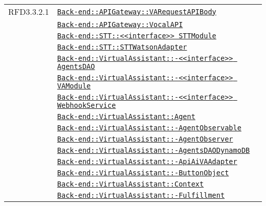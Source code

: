 \begin{longtable}{|>{\centering}m{3cm}|m{10cm}<{\centering}|}
RFD3.3.2.1 & \hyperref[Back-end::APIGateway::VARequestAPIBody]{\texttt{Back-end::APIGateway::VARequestAPIBody}}\\
& \hyperref[Back-end::APIGateway::VocalAPI]{\texttt{Back-end::APIGateway::VocalAPI}}\\
& \hyperref[Back-end::STT::<<interface>> STTModule]{\texttt{Back-end::STT::<<interface>> STTModule}}\\
& \hyperref[Back-end::STT::STTWatsonAdapter]{\texttt{Back-end::STT::STTWatsonAdapter}}\\
& \hyperref[Back-end::VirtualAssistant::<<interface>> AgentsDAO]{\texttt{Back-end::VirtualAssistant::-\linebreak <<interface>> AgentsDAO}}\\
& \hyperref[Back-end::VirtualAssistant::<<interface>> VAModule]{\texttt{Back-end::VirtualAssistant::-\linebreak <<interface>> VAModule}}\\
& \hyperref[Back-end::VirtualAssistant::<<interface>> WebhookService]{\texttt{Back-end::VirtualAssistant::-\linebreak <<interface>> WebhookService}}\\
& \hyperref[Back-end::VirtualAssistant::Agent]{\texttt{Back-end::VirtualAssistant::Agent}}\\
& \hyperref[Back-end::VirtualAssistant::AgentObservable]{\texttt{Back-end::VirtualAssistant::-\linebreak AgentObservable}}\\
& \hyperref[Back-end::VirtualAssistant::AgentObserver]{\texttt{Back-end::VirtualAssistant::-\linebreak AgentObserver}}\\
& \hyperref[Back-end::VirtualAssistant::AgentsDAODynamoDB]{\texttt{Back-end::VirtualAssistant::-\linebreak AgentsDAODynamoDB}}\\
& \hyperref[Back-end::VirtualAssistant::ApiAiVAAdapter]{\texttt{Back-end::VirtualAssistant::-\linebreak ApiAiVAAdapter}}\\
& \hyperref[Back-end::VirtualAssistant::ButtonObject]{\texttt{Back-end::VirtualAssistant::-\linebreak ButtonObject}}\\
& \hyperref[Back-end::VirtualAssistant::Context]{\texttt{Back-end::VirtualAssistant::Context}}\\
& \hyperref[Back-end::VirtualAssistant::Fulfillment]{\texttt{Back-end::VirtualAssistant::-\linebreak Fulfillment}}\\

\end{longtable}
